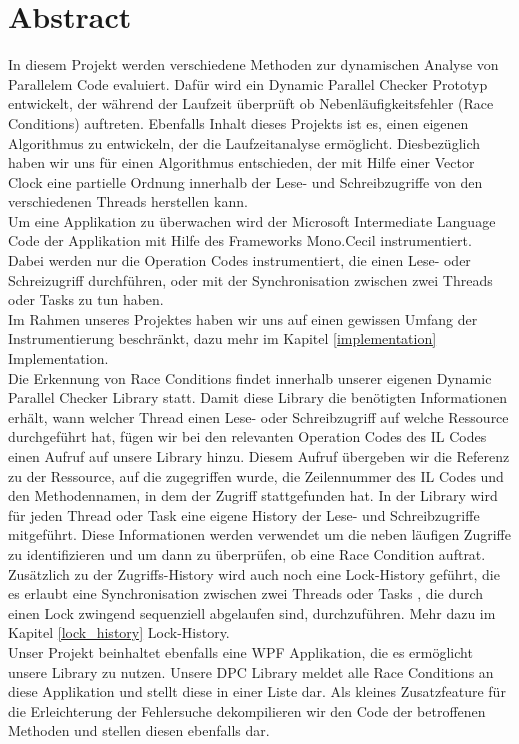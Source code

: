 \documentclass[10pt,a4paper]{article}
\begin{document}
\section{Abstract}
\begin{flushleft}
In diesem Projekt werden verschiedene Methoden zur dynamischen Analyse von Parallelem Code evaluiert. Dafür wird ein Dynamic Parallel Checker Prototyp entwickelt, der während der Laufzeit überprüft ob Nebenläufigkeitsfehler (Race Conditions) auftreten. Ebenfalls Inhalt dieses Projekts ist es, einen eigenen Algorithmus zu entwickeln, der die Laufzeitanalyse ermöglicht. Diesbezüglich haben wir uns für einen Algorithmus entschieden, der mit Hilfe einer Vector Clock eine partielle Ordnung innerhalb der Lese- und Schreibzugriffe von den verschiedenen Threads herstellen kann.\\
Um eine Applikation zu überwachen wird der Microsoft Intermediate Language Code der Applikation mit Hilfe des Frameworks Mono.Cecil instrumentiert. Dabei werden nur die Operation Codes instrumentiert, die einen Lese- oder Schreizugriff durchführen, oder mit der Synchronisation zwischen zwei Threads oder Tasks zu tun haben.\\
Im Rahmen unseres Projektes haben wir uns auf einen gewissen Umfang der Instrumentierung beschränkt, dazu mehr im Kapitel \ref{implementation} Implementation.\\
Die Erkennung von Race Conditions findet innerhalb unserer eigenen Dynamic Parallel Checker Library statt. Damit diese Library die benötigten Informationen erhält, wann welcher Thread einen Lese- oder Schreibzugriff auf welche Ressource durchgeführt hat, fügen wir bei den relevanten Operation Codes des IL Codes einen Aufruf auf unsere Library hinzu. 
Diesem Aufruf übergeben wir die Referenz zu der Ressource, auf die zugegriffen wurde, die Zeilennummer des IL Codes und den Methodennamen, in dem der Zugriff stattgefunden hat. In der Library wird für jeden Thread oder Task eine eigene History der Lese- und Schreibzugriffe mitgeführt. Diese Informationen werden verwendet um die neben läufigen Zugriffe zu identifizieren und um dann zu überprüfen, ob eine Race Condition auftrat. Zusätzlich zu der Zugriffs-History wird auch noch eine Lock-History geführt, die es erlaubt eine Synchronisation zwischen zwei Threads oder Tasks , die durch einen Lock zwingend sequenziell abgelaufen sind, durchzuführen. Mehr dazu im Kapitel \ref{lock_history} Lock-History.\\
Unser Projekt beinhaltet ebenfalls eine WPF Applikation, die es ermöglicht unsere Library zu nutzen. Unsere DPC Library meldet alle Race Conditions an diese Applikation und stellt diese in einer Liste dar. Als kleines Zusatzfeature für die Erleichterung der Fehlersuche dekompilieren wir den Code der betroffenen Methoden und stellen diesen ebenfalls dar.\\
\end{flushleft}
\newpage
\end{document}
